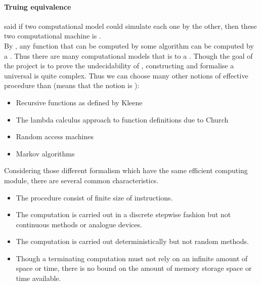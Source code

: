 \paragraph{Truing equivalence} said if two computational model could simulate each one by the other, then these two computational machine is \cite{rogers_theory_1987}.\\
By , any function that can be computed by some algorithm can be computed by a \cite{church_unsolvable_1936}.
Thus there are many computational models that is  to a \cite{copeland_church-turing_2002}.
Though the goal of the project is to prove the undecidability of , constructing and formalise a universal  is quite complex. 
Thus we can choose many other notions of effective procedure than  (means that the notion is ):
\begin{itemize}
  \item Recursive functions as defined by Kleene \cite{yasuhara_recursive_1971}
  \item The lambda calculus approach to function definitions due to Church \cite{moggi_computational_1988}
  \item Random access machines \cite{cook_time-bounded_1972}
  \item Markov algorithms\cite{_markov_2015}
\end{itemize}
Considering those different formalism which have the same efficient computing module, there are several common characteristics\cite{jones_computability_1997}.
\begin{itemize}
  \item The procedure consist of finite size of instructions.
  \item The computation is carried out in a discrete stepwise fashion but not continuous methods or analogue devices.
  \item The computation is carried out deterministically but not random methods.
  \item Though a terminating computation must not rely on an infinite amount of space or time, there is no bound on the amount of memory storage space or time available.
\end{itemize}
